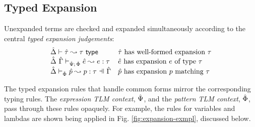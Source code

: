 \documentclass[acmsmall,review,anonymous]{acmart}\settopmatter{printfolios=true,printccs=false,printacmref=false}
\begin{document}
\subsection{Typed Expansion}\label{sec:typed-expansion-U}\label{sec:s-TE}
Unexpanded terms are checked and expanded simultaneously according to the central \emph{typed expansion judgements}:
\[\begin{array}{ll}
\expandsTU{\uDelta}{\utau}{\tau} & \text{$\utau$ has well-formed expansion $\tau$}\\
\expandsUPX{\ue}{e}{\tau} & \text{$\ue$ has expansion $e$ of type $\tau$}\\
\patExpands{\upctx}{\uPhi}{\upv}{p}{\tau} & \text{$\upv$ has expansion $p$ matching $\tau$}
\end{array}\]






The typed expansion rules that handle common forms mirror the corresponding typing rules. The \emph{expression TLM context}, $\hat{\Psi}$, and the \emph{pattern TLM context}, $\hat\Phi$, pass through these rules opaquely. For example, the rules for variables and lambdas are shown being applied in Fig. \ref{fig:expansion-exmpl}, discussed below. 
\end{document}

